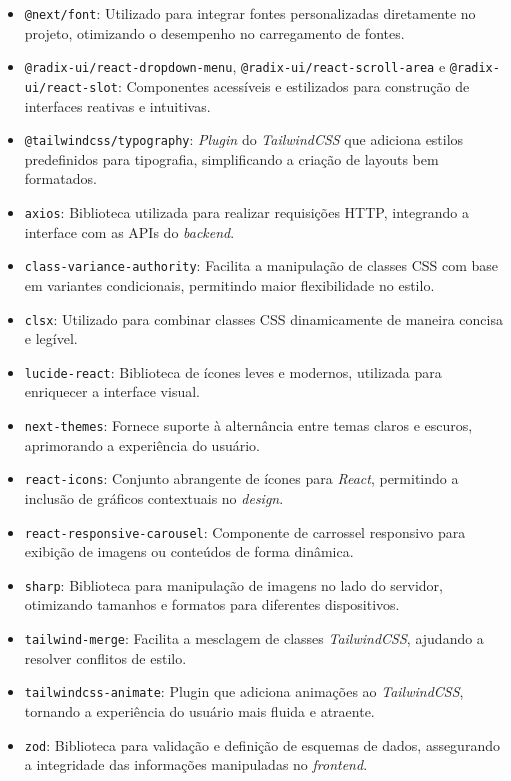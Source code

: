 \begin{itemize} 
  \item \texttt{@next/font}: Utilizado para integrar fontes personalizadas diretamente no projeto, otimizando o desempenho no carregamento de fontes. 
  \item \texttt{@radix-ui/react-dropdown-menu}, \texttt{@radix-ui/react-scroll-area} e \texttt{@radix-ui/react-slot}: Componentes acessíveis e estilizados para construção de interfaces reativas e intuitivas.
  \item \texttt{@tailwindcss/typography}: \textit{Plugin} do \textit{TailwindCSS} que adiciona estilos predefinidos para tipografia, simplificando a criação de layouts bem formatados. 
  \item \texttt{axios}: Biblioteca utilizada para realizar requisições HTTP, integrando a interface com as APIs do \textit{backend}. 
  \item \texttt{class-variance-authority}: Facilita a manipulação de classes CSS com base em variantes condicionais, permitindo maior flexibilidade no estilo. 
  \item \texttt{clsx}: Utilizado para combinar classes CSS dinamicamente de maneira concisa e legível. 
  \item \texttt{lucide-react}: Biblioteca de ícones leves e modernos, utilizada para enriquecer a interface visual. 
  \item \texttt{next-themes}: Fornece suporte à alternância entre temas claros e escuros, aprimorando a experiência do usuário. 
  \item \texttt{react-icons}: Conjunto abrangente de ícones para \textit{React}, permitindo a inclusão de gráficos contextuais no \textit{design}. 
  \item \texttt{react-responsive-carousel}: Componente de carrossel responsivo para exibição de imagens ou conteúdos de forma dinâmica. 
  \item \texttt{sharp}: Biblioteca para manipulação de imagens no lado do servidor, otimizando tamanhos e formatos para diferentes dispositivos. 
  \item \texttt{tailwind-merge}: Facilita a mesclagem de classes \textit{TailwindCSS}, ajudando a resolver conflitos de estilo. 
  \item \texttt{tailwindcss-animate}: Plugin que adiciona animações ao \textit{TailwindCSS}, tornando a experiência do usuário mais fluida e atraente. 
  \item \texttt{zod}: Biblioteca para validação e definição de esquemas de dados, assegurando a integridade das informações manipuladas no \textit{frontend}. \end{itemize}

